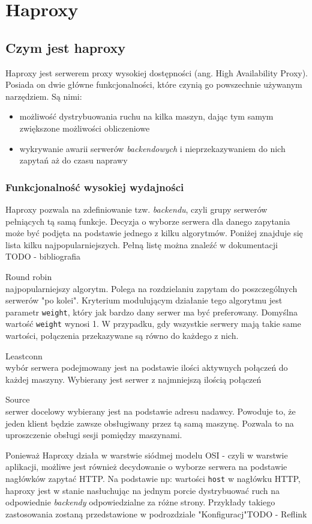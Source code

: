 {\section{Haproxy}
\subsection{Czym jest haproxy}
Haproxy jest serwerem proxy wysokiej dostępności (ang. High Availability Proxy).\\
Posiada on dwie główne funkcjonalności, które czynią go powszechnie używanym narzędziem.
Są nimi:\\
\begin{itemize}
	\item możliwość dystrybuowania ruchu na kilka maszyn, dając tym samym zwiększone możliwości obliczeniowe
	\item wykrywanie awarii serwerów \textit{backendowych} i nieprzekazywaniem do nich zapytań aż do czasu naprawy
\end{itemize}
\subsubsection{Funkcjonalność wysokiej wydajności}
Haproxy pozwala na zdefiniowanie tzw. \textit{backendu}, czyli grupy serwerów pełniących tą samą funkcje.
Decyzja o wyborze serwera dla danego zapytania może być podjęta na podstawie jednego z kilku algorytmów.
Poniżej znajduje się lista kilku najpopularniejszych. Pełną listę można znaleźć w dokumentacji\\
\LARGE TODO - bibliografia\normalsize
\begin{description}
	\item{Round robin}\\
		najpopularniejszy algorytm. Polega na rozdzielaniu zapytam do poszczególnych serwerów "po kolei".
		Kryterium modulującym działanie tego algorytmu jest parametr \texttt{weight}, który jak bardzo dany serwer ma być preferowany.
		Domyślna wartość \texttt{weight} wynosi 1. W przypadku, gdy wszystkie serwery mają takie same wartości, połączenia przekazywane są równo do każdego z nich.
	\item{Leastconn}\\
		wybór serwera podejmowany jest na podstawie ilości aktywnych połączeń do każdej maszyny.
		Wybierany jest serwer z najmniejszą ilością połączeń
	\item{Source}\\
		serwer docelowy wybierany jest na podstawie adresu nadawcy.
		Powoduje to, że jeden klient będzie zawsze obsługiwany przez tą samą maszynę. Pozwala to na uproszczenie obsługi sesji pomiędzy maszynami.
\end{description}
Ponieważ Haproxy działa w warstwie siódmej modelu OSI - czyli w warstwie aplikacji, możliwe jest również decydowanie o wyborze serwera na podstawie nagłówków zapytać HTTP.
Na podstawie np: wartości \texttt{host} w nagłówku HTTP, haproxy jest w stanie nasłuchując na jednym porcie dystrybuować ruch na odpowiednie \textit{backendy} odpowiedzialne za różne strony.
Przykłady takiego zastosowania zostaną przedstawione w podrozdziale "Konfiguracj"\LARGE TODO - Reflink\normalsize
}
